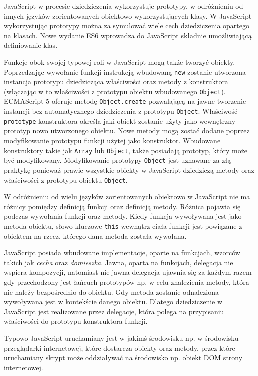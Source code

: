 JavaScript w procesie dziedziczenia wykorzystuje prototypy, w odróżnieniu od innych języków zorientowanych obiektowo wykorzystujących klasy. W JavaScript wykorzystując prototypy można za symulować wiele cech dziedziczenia opartego na klasach\cite{jsWiki}. Nowe wydanie ES6 wprowadza do JavaScript składnie umożliwiającą definiowanie klas.  

Funkcje obok swojej typowej roli w JavaScript mogą także tworzyć obiekty. Poprzedzając wywołanie funkcji instrukcją wbudowaną \verb|new| zostanie utworzona instancja prototypu dziedzicząca właściwości oraz metody z konstruktora (włączając w to właściwości z prototypu obiektu wbudowanego \verb|Object|). ECMAScript 5 oferuje metodę \verb|Object.create| pozwalającą na jawne tworzenie instancji bez automatycznego dziedziczenia z prototypu \verb|Object|. Właściwość \verb|prototype| konstruktora określa jaki obiekt zostanie użyty jako wewnętrzny prototyp nowo utworzonego obiektu. Nowe metody mogą zostać dodane poprzez modyfikowanie prototypu funkcji użytej jako konstruktor. Wbudowane konstruktory takie jak \verb|Array| lub \verb|Object|, także posiadają prototyp, który może być modyfikowany. Modyfikowanie prototypy \verb|Object| jest uznawane za złą praktykę ponieważ prawie wszystkie obiekty w JavaScript dziedziczą metody oraz właściwości z prototypu obiektu \verb|Object|\cite{jsWiki}.

W odróżnieniu od wielu języków zorientowanych obiektowo w JavaScript nie ma różnicy pomiędzy definicją funkcji oraz definicją metody. Różnica pojawia się podczas wywołania funkcji oraz metody. Kiedy funkcja wywoływana jest jako metoda obiektu, słowo kluczowe \verb|this| wewnątrz ciała funkcji jest powiązane z obiektem na rzecz, którego dana metoda została wywołana\cite{jsWiki}. 

JavaScript posiada wbudowane implementacje, oparte na funkcjach, wzorców takich jak \textit{cecha} oraz \textit{domieszka}. Jawna, oparta na funkcjach, delegacja nie wspiera kompozycji, natomiast nie jawna delegacja ujawnia się za każdym razem gdy przechodzony jest łańcuch prototypów np. w celu znalezienia metody, która nie należy bezpośrednio do obiektu. Gdy metoda zostanie odnaleziona wywoływana jest w kontekście danego obiektu. Dlatego dziedziczenie w JavaScript jest realizowane przez delegacje, która polega na przypisaniu właściwości do prototypu konstruktora funkcji\cite{jsWiki}.

Typowo JavaScript uruchamiany jest w jakimś środowisku np. w środowisku przeglądarki internetowej, które dostarcza obiekty oraz metody, przez które uruchamiany skrypt może oddziaływać na środowisko np. obiekt DOM strony internetowej. 

